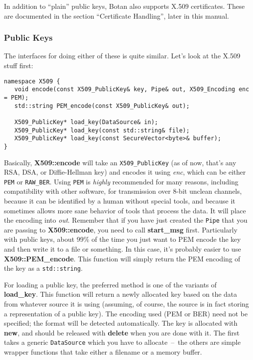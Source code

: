 \documentclass{article}
\newcommand{\function}[1]{\textbf{#1}}
\newcommand{\type}[1]{\texttt{#1}}
\renewcommand{\arg}[1]{\textsl{#1}}
\begin{document}
In addition to ``plain'' public keys, Botan also supports X.509 certificates.
These are documented in the section ``Certificate Handling'', later in this
manual.

\subsubsection{Public Keys}

The interfaces for doing either of these is quite similar. Let's look at the
X.509 stuff first:
\begin{verbatim}
namespace X509 {
   void encode(const X509_PublicKey& key, Pipe& out, X509_Encoding enc = PEM);
   std::string PEM_encode(const X509_PublicKey& out);

   X509_PublicKey* load_key(DataSource& in);
   X509_PublicKey* load_key(const std::string& file);
   X509_PublicKey* load_key(const SecureVector<byte>& buffer);
}
\end{verbatim}

Basically, \function{X509::encode} will take an \type{X509\_PublicKey}
(as of now, that's any RSA, DSA, or Diffie-Hellman key) and encodes it
using \arg{enc}, which can be either \type{PEM} or
\type{RAW\_BER}. Using \type{PEM} is \emph{highly} recommended for
many reasons, including compatibility with other software, for
transmission over 8-bit unclean channels, because it can be identified
by a human without special tools, and because it sometimes allows more
sane behavior of tools that process the data. It will place the
encoding into \arg{out}. Remember that if you have just created the
\type{Pipe} that you are passing to \function{X509::encode}, you need
to call \function{start\_msg} first. Particularly with public keys,
about 99\% of the time you just want to PEM encode the key and then
write it to a file or something. In this case, it's probably easier to
use \function{X509::PEM\_encode}. This function will simply return the
PEM encoding of the key as a \type{std::string}.

For loading a public key, the preferred method is one of the variants
of \function{load\_key}. This function will return a newly allocated
key based on the data from whatever source it is using (assuming, of
course, the source is in fact storing a representation of a public
key). The encoding used (PEM or BER) need not be specified; the format
will be detected automatically. The key is allocated with
\function{new}, and should be released with \function{delete} when you
are done with it. The first takes a generic \type{DataSource} which
you have to allocate~--~the others are simple wrapper functions that
take either a filename or a memory buffer.
\end{document}
